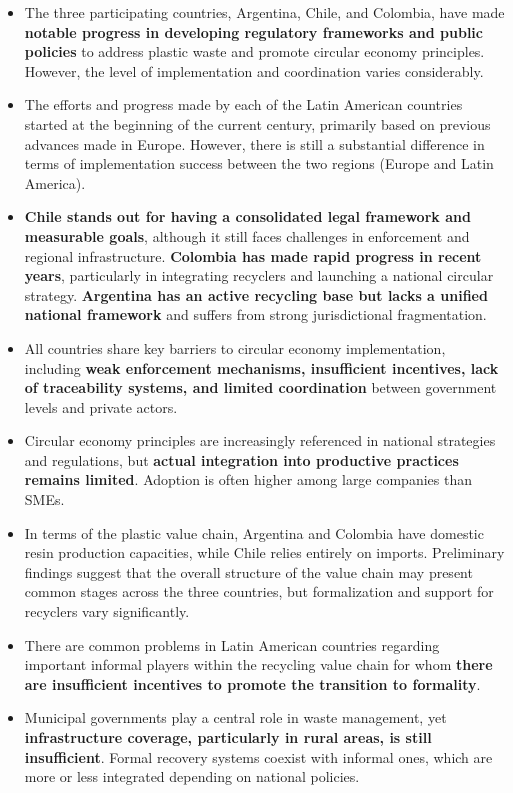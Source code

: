 \documentclass[
  12pt,
  oneside]{book}
\providecommand{\tightlist}{%
  \setlength{\itemsep}{0pt}\setlength{\parskip}{0pt}}
\begin{document}
\begin{itemize}
\tightlist
\item
  The three participating countries, Argentina, Chile, and Colombia,
  have made \textbf{notable progress in developing regulatory frameworks
  and public policies} to address plastic waste and promote circular
  economy principles. However, the level of implementation and
  coordination varies considerably.
\item
  The efforts and progress made by each of the Latin American countries
  started at the beginning of the current century, primarily based on
  previous advances made in Europe. However, there is still a
  substantial difference in terms of implementation success between the
  two regions (Europe and Latin America).
\item
  \textbf{Chile stands out for having a consolidated legal framework and
  measurable goals}, although it still faces challenges in enforcement
  and regional infrastructure. \textbf{Colombia has made rapid progress
  in recent years}, particularly in integrating recyclers and launching
  a national circular strategy. \textbf{Argentina has an active
  recycling base but lacks a unified national framework} and suffers
  from strong jurisdictional fragmentation.
\item
  All countries share key barriers to circular economy implementation,
  including \textbf{weak enforcement mechanisms, insufficient
  incentives, lack of traceability systems, and limited coordination}
  between government levels and private actors.
\item
  Circular economy principles are increasingly referenced in national
  strategies and regulations, but \textbf{actual integration into
  productive practices remains limited}. Adoption is often higher among
  large companies than SMEs.
\item
  In terms of the plastic value chain, Argentina and Colombia have
  domestic resin production capacities, while Chile relies entirely on
  imports. Preliminary findings suggest that the overall structure of
  the value chain may present common stages across the three countries,
  but formalization and support for recyclers vary significantly.
\item
  There are common problems in Latin American countries regarding
  important informal players within the recycling value chain for whom
  \textbf{there are insufficient incentives to promote the transition to
  formality}.
\item
  Municipal governments play a central role in waste management, yet
  \textbf{infrastructure coverage, particularly in rural areas, is still
  insufficient}. Formal recovery systems coexist with informal ones,
  which are more or less integrated depending on national policies.
\end{itemize}
\end{document}
